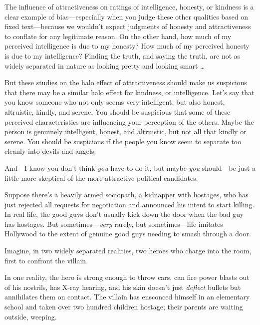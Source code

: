 {
 The influence of attractiveness on ratings of intelligence,
honesty, or kindness is a clear example of bias---especially when you
judge these other qualities based on fixed text---because we
wouldn't expect judgments of honesty and attractiveness
to conflate for any legitimate reason. On the other hand, how much of
my perceived intelligence is due to my honesty? How much of my
perceived honesty is due to my intelligence? Finding the truth, and
saying the truth, are not as widely separated in nature as looking
pretty and looking smart \ldots}

{
 But these studies on the halo effect of attractiveness should make
us suspicious that there may be a similar halo effect for kindness, or
intelligence. Let's say that you know someone who not
only seems very intelligent, but also honest, altruistic, kindly, and
serene. You should be suspicious that some of these perceived
characteristics are influencing your perception of the others. Maybe
the person is genuinely intelligent, honest, and altruistic, but not
all that kindly or serene. You should be suspicious if the people you
know seem to separate too cleanly into devils and angels.}

{
 And---I know you don't think \textit{you} have to
do it, but maybe \textit{you} should---be just a little more skeptical
of the more attractive political candidates.}

\myendsectiontext


\bigskip


{
 Suppose there's a heavily armed sociopath, a
kidnapper with hostages, who has just rejected all requests for
negotiation and announced his intent to start killing. In real life,
the good guys don't usually kick down the door when the
bad guy has hostages. But sometimes---\textit{very} rarely, but
sometimes---life imitates Hollywood to the extent of genuine good guys
needing to smash through a door. }

{
 Imagine, in two widely separated realities, two heroes who charge
into the room, first to confront the villain.}

{
 In one reality, the hero is strong enough to throw cars, can fire
power blasts out of his nostrils, has X-ray hearing, and his skin
doesn't just \textit{deflect} bullets but annihilates
them on contact. The villain has ensconced himself in an elementary
school and taken over two hundred children hostage; their parents are
waiting outside, weeping.}

